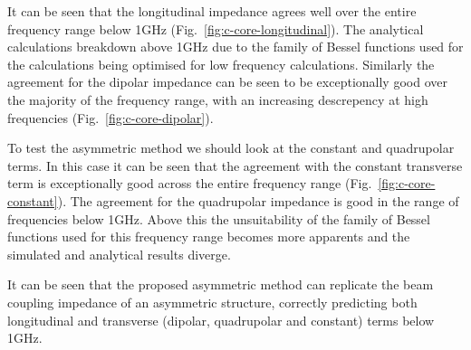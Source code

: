 \documentclass[review, number, sort&compress]{elsarticle}
\begin{document}
It can be seen that the longitudinal impedance agrees well over the entire frequency range below 1GHz (Fig.~\ref{fig:c-core-longitudinal}). The analytical calculations breakdown above 1GHz due to the family of Bessel functions used for the calculations being optimised for low frequency calculations. Similarly the agreement for the dipolar impedance can be seen to be exceptionally good over the majority of the frequency range, with an increasing descrepency at high frequencies (Fig.~\ref{fig:c-core-dipolar}).

To test the asymmetric method we should look at the constant and quadrupolar terms. In this case it can be seen that the agreement with the constant transverse term is exceptionally good across the entire frequency range (Fig.~\ref{fig:c-core-constant}). The agreement for the quadrupolar impedance is good in the range of frequencies below 1GHz. Above this the unsuitability of the family of Bessel functions used for this frequency range becomes more apparents and the simulated and analytical results diverge.

It can be seen that the proposed asymmetric method can replicate the beam coupling impedance of an asymmetric structure, correctly predicting both longitudinal and transverse (dipolar, quadrupolar and constant) terms below 1GHz. 

%
%
%
%
%
%
%
%
%
%
%



\end{document}
